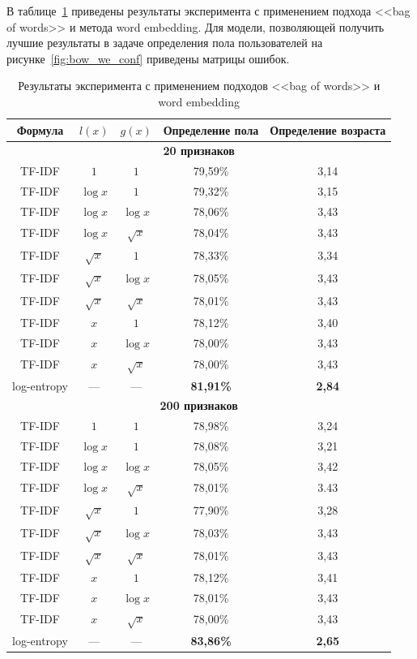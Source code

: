 В таблице~\ref{tab:bow_we} приведены результаты эксперимента
с применением подхода <<bag of words>> и метода word embedding.
Для модели, позволяющей получить лучшие результаты в задаче
определения пола пользователей на рисунке~\ref{fig:bow_we_conf}
приведены матрицы ошибок.

\begin{table}[!h]
    \caption{Результаты эксперимента с применением подходов
            <<bag of words>> и word embedding}
    \label{tab:bow_we}
\centering
\begin{tabular}{|c|c|c|c|c|}\hline
    \textbf{Формула} & \boldmath$l(x)$ & \boldmath$g(x)$ & \textbf{Определение пола} & \textbf{Определение возраста} \\\hline
    \multicolumn{5}{|c|}{\textbf{20 признаков}} \\\hline
    TF-IDF & $1$ & $1$ & 79,59\% & 3,14 \\\hline
    TF-IDF & $\log{x}$ & $1$ & 79,32\% & 3,15 \\\hline
    TF-IDF & $\log{x}$ & $\log{x}$ & 78,06\% & 3,43 \\\hline
    TF-IDF & $\log{x}$ & $\sqrt{x}$ & 78,04\% & 3,43 \\\hline
    TF-IDF & $\sqrt{x}$ & $1$ & 78,33\% & 3,34 \\\hline
    TF-IDF & $\sqrt{x}$ & $\log{x}$ & 78,05\% & 3,43 \\\hline
    TF-IDF & $\sqrt{x}$ & $\sqrt{x}$ & 78,01\% & 3,43 \\\hline
    TF-IDF & $x$ & $1$ & 78,12\% & 3,40 \\\hline
    TF-IDF & $x$ & $\log{x}$ & 78,00\% & 3,43 \\\hline
    TF-IDF & $x$ & $\sqrt{x}$ & 78,00\% & 3,43 \\\hline
    log-entropy & --- & --- & \textbf{81,91\%} & \textbf{2,84} \\\hline
    \multicolumn{5}{|c|}{\textbf{200 признаков}} \\\hline
    TF-IDF & $1$ & $1$ & 78,98\% & 3,24 \\\hline
    TF-IDF & $\log{x}$ & $1$ & 78,08\% & 3,21 \\\hline %
    TF-IDF & $\log{x}$ & $\log{x}$ & 78,05\% & 3,42 \\\hline
    TF-IDF & $\log{x}$ & $\sqrt{x}$ & 78,01\% & 3.43 \\\hline
    TF-IDF & $\sqrt{x}$ & $1$ & 77,90\% & 3,28 \\\hline %
    TF-IDF & $\sqrt{x}$ & $\log{x}$ & 78,03\% & 3,43 \\\hline
    TF-IDF & $\sqrt{x}$ & $\sqrt{x}$ & 78,01\% & 3,43 \\\hline
    TF-IDF & $x$ & $1$ & 78,12\% & 3,41 \\\hline
    TF-IDF & $x$ & $\log{x}$ & 78,01\% & 3,43 \\\hline
    TF-IDF & $x$ & $\sqrt{x}$ & 78,00\% & 3,43 \\\hline
    log-entropy & --- & --- & \textbf{83,86\%} & \textbf{2,65} \\\hline
\end{tabular}
\end{table}

